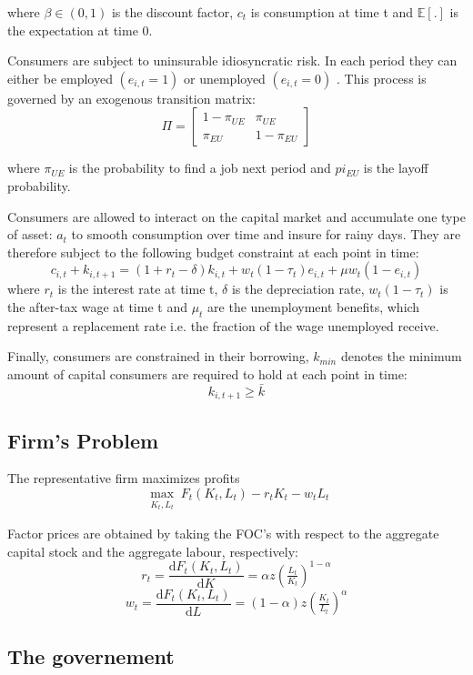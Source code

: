 \documentclass[a4paper,12pt]{article}
\begin{document}
where $\beta \in (0,1)$ is the discount factor, $ c_{t}$ is consumption at time t and $\mathbb{E[.]}$ is the expectation at time 0. 

Consumers are subject to uninsurable idiosyncratic risk. In each period they can either be employed $(e_{i,t}=1)$ or unemployed $(e_{i,t}=0)$ . This process is governed by an exogenous transition matrix:
\[ \Pi = \begin{bmatrix}
1-\pi_{UE} & \pi_{UE} \\
 \pi_{EU} & 1-\pi_{EU}
\end{bmatrix}
\]

where $\pi_{UE}$ is the probability to find a job next period and $pi_{EU}$ is the layoff probability. 

Consumers are allowed to interact on the capital market and accumulate one type of asset: $a_{t}$ to smooth consumption over time and insure for rainy days. They are therefore subject to the following budget constraint at each point in time: 
  \[ 
  c_{i,t} + k_{i,t+1} = (1 + r_{t} - \delta) k_{i,t} + w_{t} (1 - \tau_{t})  e_{i,t} + \mu w_{t} (1 - e_{i,t})
  \]
 where $r_{t}$ is the interest rate at time t, $\delta$ is the depreciation rate, $w_{t}(1-\tau_{t})$ is the after-tax wage at time t and $\mu_{t}$ are the unemployment benefits, which represent a replacement rate i.e. the fraction of the wage unemployed receive. 
  
Finally, consumers are constrained in their borrowing, $k_{min}$ denotes the minimum amount of capital consumers are required to hold at each point in time: 
   \[
   k_{i,t + 1} \geq \bar{k}
 	\]
	
\subsection{Firm's Problem}

The representative firm maximizes profits 
\[ \max_{\substack{K_{t},L_{t}}}F_{t}(K_{t},L_{t})-r_{t}K_{t}-w_{t}L_{t}
\]

Factor prices are obtained by taking the FOC's with respect to the aggregate capital stock and the aggregate labour, respectively: 
\[
r_{t} = \frac{\mathrm d F_{t}(K_{t},L_{t})}{\mathrm d K} = \alpha z (\tfrac{L_{t}}{K_{t}})^{1-\alpha} \]
\[
w_{t} = \frac{\mathrm d F_{t}(K_{t},L_{t})}{\mathrm d L} =(1-\alpha)z (\tfrac{K_{t}}{L_{t}})^{\alpha}
\]

\subsection{The governement}
\end{document}

